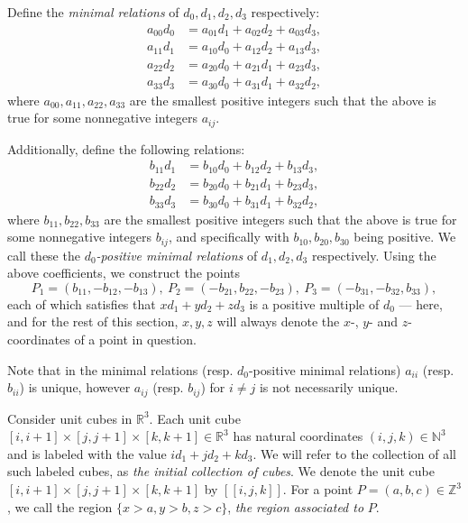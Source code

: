 \documentclass[12pt]{article}
\theoremstyle{remark}
\begin{document}
Define the \emph{minimal relations} of $d_0,d_1,d_2,d_3$ respectively:
\begin{align}
    a_{00} d_0 &= a_{01} d_1 + a_{02}d_2 + a_{03} d_3,  \label{minrelation-0} \\
    a_{11} d_1 &= a_{10} d_0+a_{12} d_2 + a_{13} d_3,  \\
    a_{22} d_2 &=a_{20} d_0+ a_{21} d_1 + a_{23} d_3,  \\
    a_{33} d_3 &= a_{30} d_0 +a_{31} d_1 + a_{32} d_2, 
\end{align}
where $a_{00},a_{11}, a_{22}, a_{33}$ are the smallest positive integers such that the above is true for some nonnegative integers $a_{ij}$.

Additionally, define the following relations:
\begin{align}
    b_{11} d_1 &= b_{10} d_0+b_{12} d_2 + b_{13} d_3,  \\
    b_{22} d_2 &= b_{20} d_0+ b_{21} d_1 + b_{23} d_3,  \\
    b_{33} d_3 &= b_{30} d_0 +b_{31} d_1 + b_{32} d_2, 
\end{align}
where $b_{11}, b_{22}, b_{33}$ are the smallest positive integers such that the above is true for some nonnegative integers $b_{ij}$, and specifically with $b_{10}, b_{20}, b_{30}$ being positive. We call these the \emph{$d_0$-positive minimal relations} of $d_1,d_2,d_3$ respectively. Using the above coefficients, we construct the points
\begin{equation}\label{positivepoints}
 P_1=(b_{11},-b_{12},-b_{13}), \ P_2=(-b_{21},b_{22},-b_{23}), \ P_3 = (-b_{31}, -b_{32}, b_{33}),
\end{equation} 
each of which satisfies that $xd_1 + yd_2 + zd_3$ is a positive multiple of $d_0$ --- here, and for the rest of this section, $x,y,z$ will always denote the $x$-, $y$- and $z$- coordinates of a point in question.

Note that in the minimal relations (resp. $d_0$-positive minimal relations) $a_{ii}$ (resp. $b_{ii}$) is unique, however $a_{ij}$ (resp. $b_{ij}$) for $i \neq j$ is not necessarily unique.

Consider unit cubes in $\mathbb{R}^3$. Each unit cube $[i,i+1] \times [j,j+1] \times [k,k+1] \in \mathbb{R}^3$ has natural coordinates $(i,j,k) \in \mathbb{N}^3$ and is labeled with the value $id_1 + jd_2 + kd_3$. We will refer to the collection of all such labeled cubes, as \emph{the initial collection of cubes}. We denote the unit cube $[i,i+1] \times [j,j+1] \times [k,k+1]$ by $[[i,j,k]]$. For a point $P =(a,b,c) \in \mathbb{Z}^3$, we call the region $\{x > a, y>b, z>c\}$, \emph{the region associated to} $P$.
\end{document}
